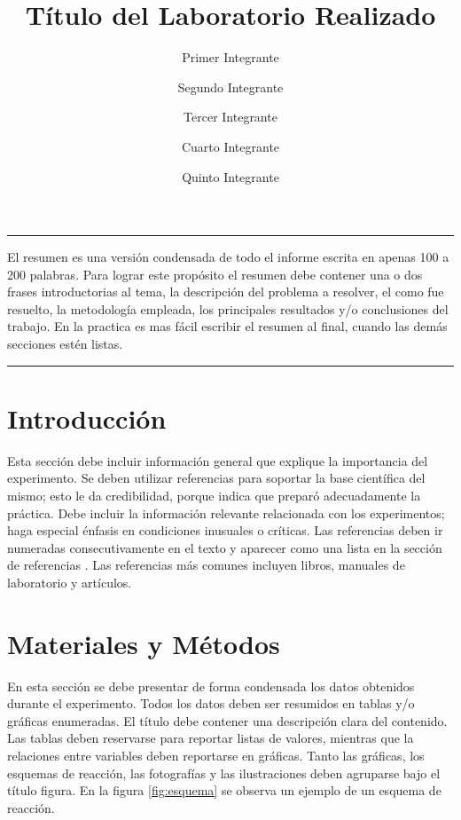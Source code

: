 \documentclass[letterpaper]{article}
\title{\textbf{Título del Laboratorio Realizado}}
\author[1]{Primer Integrante}
\author[2]{Segundo Integrante}
\author[3]{Tercer Integrante}
\author[4]{Cuarto Integrante}
\author[5]{Quinto Integrante}
\affil[1-5]{Escuela de Ciencia e Ingeniería en Materiales, Tecnológico de Costa Rica}
\affil[*]{Este trabajo evalua el atributo de investigacion nivel medio.}
\begin{document}
	
	
%
\maketitle
\renewenvironment{abstract}
 {\quotation\small\noindent\rule{\linewidth}{.5pt}\par\smallskip
  {\centering\bfseries\abstractname\par}\medskip}
 {\par\noindent\rule{\linewidth}{.5pt}\endquotation}

\begin{abstract}
El resumen es una versión condensada de todo el informe escrita en apenas 100
a 200 palabras. Para lograr este propósito el resumen debe contener una o dos frases
introductorias al tema, la descripción del problema a resolver, el como fue resuelto,
la metodología empleada, los principales resultados y/o conclusiones del trabajo. En
la practica es mas fácil escribir el resumen al final, cuando las demás secciones estén
listas.
\end{abstract}

\section{Introducción}

Esta sección debe incluir información general que explique la importancia del experimento. Se deben utilizar referencias para soportar la base científica del mismo; esto le da credibilidad, porque indica que preparó adecuadamente la práctica. Debe incluir la información relevante relacionada con los experimentos; haga especial énfasis en condiciones inusuales o críticas. Las referencias deben ir numeradas consecutivamente en el texto y aparecer como una lista en la sección de referencias \cite{Cooper2009}. Las referencias más comunes incluyen libros, manuales de laboratorio y artículos.

\section{Materiales y Métodos}

En esta sección se debe presentar de forma condensada los datos obtenidos durante el experimento. Todos los datos deben ser resumidos en tablas y/o gráficas enumeradas. El título debe contener una descripción clara del contenido. 
Las tablas deben reservarse para reportar listas de valores, mientras que la relaciones entre variables deben reportarse en gráficas. Tanto las gráficas, los esquemas de reacción, las fotografías y las ilustraciones deben agruparse bajo el título figura. En la figura \ref{fig:esquema} se observa un ejemplo de un esquema de reacción.
\end{document}

